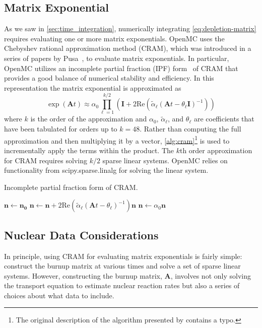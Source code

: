 \documentclass[3p,authoryear]{elsarticle}
\newcommand{\vect}[1]{\mathbf{#1}} %
\begin{document}
\subsection{Matrix Exponential}

As we saw in \cref{sec:time_integration}, numerically integrating
\cref{eq:depletion-matrix} requires evaluating one or more matrix exponentials.
OpenMC uses the Chebyshev rational approximation method (CRAM), which was
introduced in a series of papers by Pusa~\citep{pusa2010nse,pusa2011nse}, to
evaluate matrix exponentials. In particular, OpenMC utilizes an incomplete
partial fraction (IPF) form~\citep{pusa2016nse} of CRAM that provides a good
balance of numerical stability and efficiency. In this representation the matrix
exponential is approximated as
\begin{equation}
    \exp(\vect{A}t) \approx \alpha_0 \prod\limits_{\ell=1}^{k/2} \left (
    \vect{I} + 2 \text{Re} \left ( \widetilde{\alpha}_\ell \left (\vect{A}t
    - \theta_\ell \vect{I} \right )^{-1} \right ) \right )
\end{equation}
where $k$ is the order of the approximation and $\alpha_0$,
$\widetilde{\alpha}_\ell$, and $\theta_\ell$ are coefficients that have been
tabulated for orders up to $k=48$. Rather than computing the full approximation
and then multiplying it by a vector, \cref{alg:cram}\footnote{The original
description of the algorithm presented by \citet{pusa2016nse} contains a typo.}
is used to incrementally apply the terms within the product. The $k$th order
approximation for CRAM requires solving $k/2$ sparse linear systems. OpenMC
relies on functionality from scipy.sparse.linalg for solving the linear system.
\begin{algorithm}[H]
  \caption{Incomplete partial fraction form of CRAM.}
  \label{alg:cram}
  \begin{algorithmic}[1]
    \State $\vect{n} \gets \vect{n_0}$
      \State $\vect{n} \gets \vect{n} + 2\text{Re}(\widetilde{\alpha}_\ell
        (\vect{A}t - \theta_\ell)^{-1})\vect{n}$
    \EndFor
    \State $\vect{n} \gets \alpha_0 \vect{n}$
  \end{algorithmic}
\end{algorithm}

\subsection{Nuclear Data Considerations}

In principle, using CRAM for evaluating matrix exponentials is fairly simple:
construct the burnup matrix at various times and solve a set of sparse linear
systems. However, constructing the burnup matrix, $\vect{A}$, involves not only
solving the transport equation to estimate nuclear reaction rates but also a
series of choices about what data to include.
\end{document}
